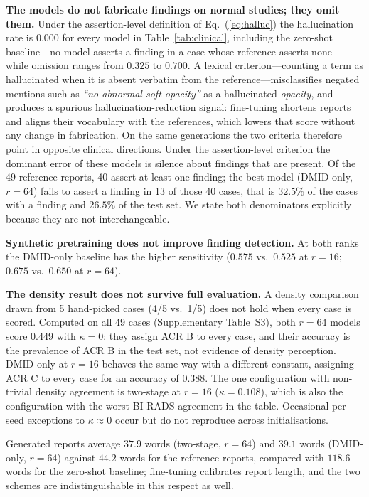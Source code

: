 \documentclass{wlscirep}
\begin{document}
\textbf{The models do not fabricate findings on normal studies; they omit them.} Under the assertion-level definition of Eq.~(\ref{eq:halluc}) the hallucination rate is $0.000$ for every model in Table~\ref{tab:clinical}, including the zero-shot baseline---no model asserts a finding in a case whose reference asserts none---while omission ranges from $0.325$ to $0.700$. A lexical criterion---counting a term as hallucinated when it is absent verbatim from the reference---misclassifies negated mentions such as \emph{``no abnormal soft opacity''} as a hallucinated \emph{opacity}, and produces a spurious hallucination-reduction signal: fine-tuning shortens reports and aligns their vocabulary with the references, which lowers that score without any change in fabrication. On the same generations the two criteria therefore point in opposite clinical directions. Under the assertion-level criterion the dominant error of these models is silence about findings that are present. Of the 49 reference reports, 40 assert at least one finding; the best model (DMID-only, $r=64$) fails to assert a finding in 13 of those 40 cases, that is $32.5\%$ of the cases with a finding and $26.5\%$ of the test set. We state both denominators explicitly because they are not interchangeable.

\textbf{Synthetic pretraining does not improve finding detection.} At both ranks the DMID-only baseline has the higher sensitivity ($0.575$ vs.\ $0.525$ at $r=16$; $0.675$ vs.\ $0.650$ at $r=64$).

\textbf{The density result does not survive full evaluation.} A density comparison drawn from 5 hand-picked cases (4/5 vs.\ 1/5) does not hold when every case is scored. Computed on all 49 cases (Supplementary Table~S3), both $r=64$ models score $0.449$ with $\kappa = 0$: they assign ACR B to every case, and their accuracy is the prevalence of ACR B in the test set, not evidence of density perception. DMID-only at $r=16$ behaves the same way with a different constant, assigning ACR C to every case for an accuracy of $0.388$. The one configuration with non-trivial density agreement is two-stage at $r=16$ ($\kappa = 0.108$), which is also the configuration with the worst BI-RADS agreement in the table. Occasional per-seed exceptions to $\kappa \approx 0$ occur but do not reproduce across initialisations.

Generated reports average $37.9$ words (two-stage, $r=64$) and $39.1$ words (DMID-only, $r=64$) against $44.2$ words for the reference reports, compared with $118.6$ words for the zero-shot baseline; fine-tuning calibrates report length, and the two schemes are indistinguishable in this respect as well.
\end{document}
